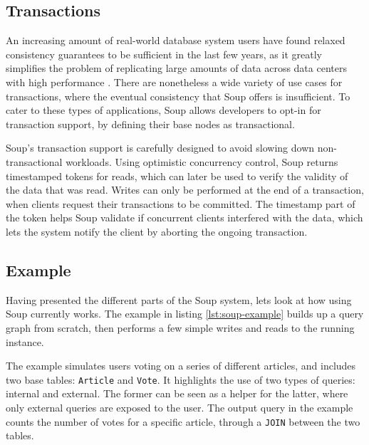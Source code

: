 \documentclass[b5paper]{report}
\begin{document}
\subsection{Transactions}
An increasing amount of real-world database system users have found relaxed
consistency guarantees to be sufficient in the last few years, as it greatly
simplifies the problem of replicating large amounts of data across data centers
with high performance \cite{existential}. There are nonetheless a wide variety
of use cases for transactions, where the eventual consistency that Soup offers
is insufficient. To cater to these types of applications, Soup allows developers
to opt-in for transaction support, by defining their base nodes as
transactional.

Soup's transaction support is carefully designed to avoid slowing down
non-transactional workloads. Using optimistic concurrency control, Soup returns
timestamped tokens for reads, which can later be used to verify the validity of
the data that was read. Writes can only be performed at the end of a
transaction, when clients request their transactions to be committed. The
timestamp part of the token helps Soup validate if concurrent clients
interfered with the data, which lets the system notify the client by aborting
the ongoing transaction.

\subsection{Example} \label{example}
Having presented the different parts of the Soup system, lets look at how using
Soup currently works. The example in listing \ref{lst:soup-example} builds up a query
graph from scratch, then performs a few simple writes and reads to the running
instance.

The example simulates users voting on a series of different articles, and
includes two base tables: \texttt{Article} and \texttt{Vote}. It highlights the
use of two types of queries: internal and external. The former can be seen as a
helper for the latter, where only external queries are exposed to the user. The
output query in the example counts the number of votes for a specific article,
through a \texttt{JOIN} between the two tables.
\end{document}
